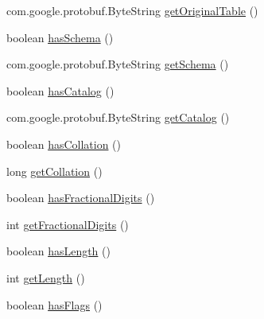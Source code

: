 \begin{DoxyCompactItemize}
com.\+google.\+protobuf.\+Byte\+String \mbox{\hyperlink{interfacecom_1_1mysql_1_1cj_1_1x_1_1protobuf_1_1_mysqlx_resultset_1_1_column_meta_data_or_builder_aae12ec896471c23b17b70d8edd892f5d}{get\+Original\+Table}} ()
\item 
boolean \mbox{\hyperlink{interfacecom_1_1mysql_1_1cj_1_1x_1_1protobuf_1_1_mysqlx_resultset_1_1_column_meta_data_or_builder_a9d8bce745c578a03db8acde762666482}{has\+Schema}} ()
\item 
com.\+google.\+protobuf.\+Byte\+String \mbox{\hyperlink{interfacecom_1_1mysql_1_1cj_1_1x_1_1protobuf_1_1_mysqlx_resultset_1_1_column_meta_data_or_builder_ada506070a416bcff68a3bf6708622dcb}{get\+Schema}} ()
\item 
boolean \mbox{\hyperlink{interfacecom_1_1mysql_1_1cj_1_1x_1_1protobuf_1_1_mysqlx_resultset_1_1_column_meta_data_or_builder_a00855f37ae7f0aefafec5e97b3fab267}{has\+Catalog}} ()
\item 
com.\+google.\+protobuf.\+Byte\+String \mbox{\hyperlink{interfacecom_1_1mysql_1_1cj_1_1x_1_1protobuf_1_1_mysqlx_resultset_1_1_column_meta_data_or_builder_a0ebe8d565c7901a2c16a9a6fc4fbe5c5}{get\+Catalog}} ()
\item 
boolean \mbox{\hyperlink{interfacecom_1_1mysql_1_1cj_1_1x_1_1protobuf_1_1_mysqlx_resultset_1_1_column_meta_data_or_builder_aa5e60deaeb3b74f937c652b4121ec6b0}{has\+Collation}} ()
\item 
long \mbox{\hyperlink{interfacecom_1_1mysql_1_1cj_1_1x_1_1protobuf_1_1_mysqlx_resultset_1_1_column_meta_data_or_builder_a47a783f7edc643ace45bff6627206456}{get\+Collation}} ()
\item 
boolean \mbox{\hyperlink{interfacecom_1_1mysql_1_1cj_1_1x_1_1protobuf_1_1_mysqlx_resultset_1_1_column_meta_data_or_builder_a14d184817af0a35f7083826fcaa689ae}{has\+Fractional\+Digits}} ()
\item 
int \mbox{\hyperlink{interfacecom_1_1mysql_1_1cj_1_1x_1_1protobuf_1_1_mysqlx_resultset_1_1_column_meta_data_or_builder_a1825cf60478ba57e9ba7e50b03f82a9b}{get\+Fractional\+Digits}} ()
\item 
boolean \mbox{\hyperlink{interfacecom_1_1mysql_1_1cj_1_1x_1_1protobuf_1_1_mysqlx_resultset_1_1_column_meta_data_or_builder_acaf2054f49f0c4b20e3dc18e952646c8}{has\+Length}} ()
\item 
int \mbox{\hyperlink{interfacecom_1_1mysql_1_1cj_1_1x_1_1protobuf_1_1_mysqlx_resultset_1_1_column_meta_data_or_builder_ae6491217502fef1519ad0b7f2c70af96}{get\+Length}} ()
\item 
boolean \mbox{\hyperlink{interfacecom_1_1mysql_1_1cj_1_1x_1_1protobuf_1_1_mysqlx_resultset_1_1_column_meta_data_or_builder_ab6b5dc1738617b91de25187a1b2f8ba4}{has\+Flags}} ()

\end{DoxyCompactItemize}
